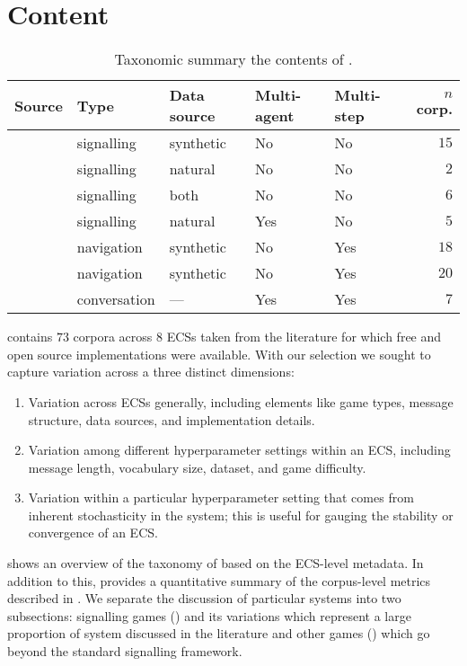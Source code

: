 \section{Content}
\unskip\label{elcc:sec:content}

\begin{table}
  \centering
  \begin{tabular}{lllllr}
    \toprule
    Source & Type & Data source & Multi-agent & Multi-step & $n$ corp. \\
    \midrule
    \citet{kharitonov-etal-2019-egg}                       & signalling   & synthetic & No & No & $15$ \\
    \citet{yao2022linking}            & signalling   & natural   & No & No & $2$ \\
    \citet{mu2021generalizations}     & signalling   & both      & No & No & $6$ \\
    \citet{chaabouni2022emergent}     & signalling   & natural   & Yes & No & $5$ \\
    \citet{unger2020GeneralizingEC}   & navigation   & synthetic & No & Yes & $18$ \\
    \citet{boldt2023mathmodel} & navigation   & synthetic & No & Yes & $20$ \\
    \citet{brandizzi2022rlupus}       & conversation & ---       & Yes & Yes & $7$ \\
    \bottomrule
  \end{tabular}
  \medskip
  \caption{Taxonomic summary the contents of \theLib{}.}
  \unskip\label{tab:tax-sum}
\end{table}


\theLib{} contains $73$ corpora across $8$ ECSs taken from the literature for which free and open source implementations were available.
With our selection we sought to capture variation across a three distinct dimensions:
\begin{enumerate}
  \item Variation across ECSs generally, including elements like game types, message structure, data sources, and implementation details.
  \item Variation among different hyperparameter settings within an ECS, including message length, vocabulary size, dataset, and game difficulty.
  \item Variation within a particular hyperparameter setting that comes from inherent stochasticity in the system; this is useful for gauging the stability or convergence of an ECS\@.
\end{enumerate}
 shows an overview of the taxonomy of \theLib{} based on the ECS-level metadata.
In addition to this,  provides a quantitative summary of the corpus-level metrics described in .
We separate the discussion of particular systems into two subsections: signalling games () and its variations which represent a large proportion of system discussed in the literature and other games () which go beyond the standard signalling framework.


